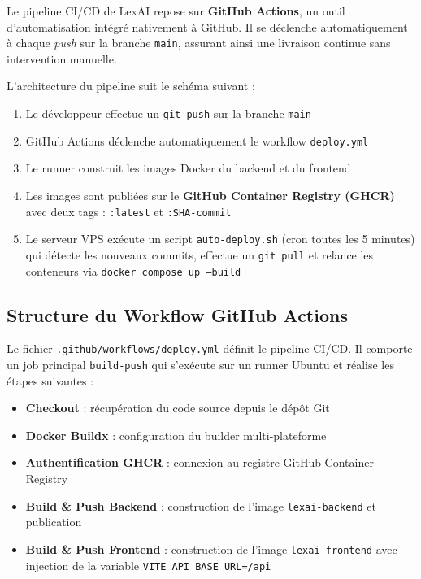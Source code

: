 Le pipeline CI/CD de LexAI repose sur \textbf{GitHub Actions}, un outil d’automatisation intégré nativement à GitHub. Il se déclenche automatiquement à chaque \textit{push} sur la branche \texttt{main}, assurant ainsi une livraison continue sans intervention manuelle.

\vspace{0.5em}

L’architecture du pipeline suit le schéma suivant :

\vspace{0.5em}

\begin{enumerate}
    \item Le développeur effectue un \texttt{git push} sur la branche \texttt{main}
    \item GitHub Actions déclenche automatiquement le workflow \texttt{deploy.yml}
    \item Le runner construit les images Docker du backend et du frontend
    \item Les images sont publiées sur le \textbf{GitHub Container Registry (GHCR)} avec deux tags : \texttt{:latest} et \texttt{:SHA-commit}
    \item Le serveur VPS exécute un script \texttt{auto-deploy.sh} (cron toutes les 5 minutes) qui détecte les nouveaux commits, effectue un \texttt{git pull} et relance les conteneurs via \texttt{docker compose up --build}
\end{enumerate}

\subsection{Structure du Workflow GitHub Actions}

Le fichier \texttt{.github/workflows/deploy.yml} définit le pipeline CI/CD. Il comporte un job principal \texttt{build-push} qui s’exécute sur un runner Ubuntu et réalise les étapes suivantes :

\begin{itemize}[label=--]
    \item \textbf{Checkout} : récupération du code source depuis le dépôt Git
    \item \textbf{Docker Buildx} : configuration du builder multi-plateforme
    \item \textbf{Authentification GHCR} : connexion au registre GitHub Container Registry
    \item \textbf{Build \& Push Backend} : construction de l’image \texttt{lexai-backend} et publication
    \item \textbf{Build \& Push Frontend} : construction de l’image \texttt{lexai-frontend} avec injection de la variable \texttt{VITE\_API\_BASE\_URL=/api}
\end{itemize}

